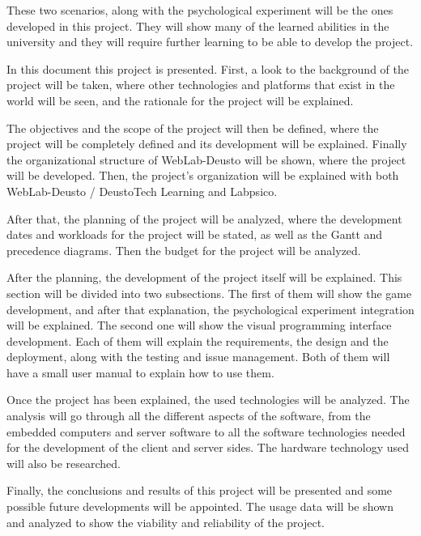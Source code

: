 These two scenarios, along with the psychological experiment will be the ones developed in this
project. They will show many of the learned abilities in the university and they will require
further learning to be able to develop the project.

In this document this project is presented. First, a look to the background of the project will be
taken, where other technologies and platforms that exist in the world will be seen, and the
rationale for the project will be explained.

The objectives and the scope of the project will then be defined, where the project will be
completely defined and its development will be explained. Finally the organizational structure of
WebLab-Deusto will be shown, where the project will be developed. Then, the project's organization
will be explained with both WebLab-Deusto / DeustoTech Learning and Labpsico.

After that, the planning of the project will be analyzed, where the development dates and workloads
for the project will be stated, as well as the Gantt and precedence diagrams. Then the budget for
the project will be analyzed.

After the planning, the development of the project itself will be explained. This section will be
divided into two subsections. The first of them will show the game development, and after that
explanation, the psychological experiment integration will be explained. The second one will show
the visual programming interface development. Each of them will explain the requirements, the design
and the deployment, along with the testing and issue management. Both of them will have a small user
manual to explain how to use them.

Once the project has been explained, the used technologies will be analyzed. The analysis will go
through all the different aspects of the software, from the embedded computers and server software
to all the software technologies needed for the development of the client and server sides. The
hardware technology used will also be researched.

Finally, the conclusions and results of this project will be presented and some possible future
developments will be appointed. The usage data will be shown and analyzed to show the viability and
reliability of the project.
